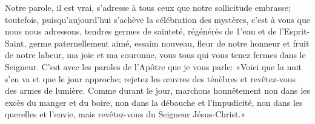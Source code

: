 Notre parole, il est vrai, s’adresse à tous ceux que notre sollicitude embrasse;
	toutefois, puisqu’aujourd’hui s’achève la célébration des mystères,
	c’est à vous que nous nous adressons, tendres germes de sainteté,
	régénérés de 1’eau et de l’Esprit-Saint,
	germe paternellement aimé, essaim nouveau,
	fleur de notre honneur et fruit de notre labeur, ma joie et ma couronne,
	vous tous qui vous tenez fermes dans le Seigneur.
C’est avec les paroles de l’Apôtre que je vous parle:
	«Voici que la nuit s’en va et que le jour approche;
	rejetez les œuvres des ténèbres et revêtez-vous des armes de lumière.
Comme durant le jour, marchons honnêtement
	non dans les excès du manger et du boire,
	non dans la débauche et l’impudicité,
	non dans les querelles et l’envie,
	mais revêtez-vous du Seigneur Jésus-Christ.»

